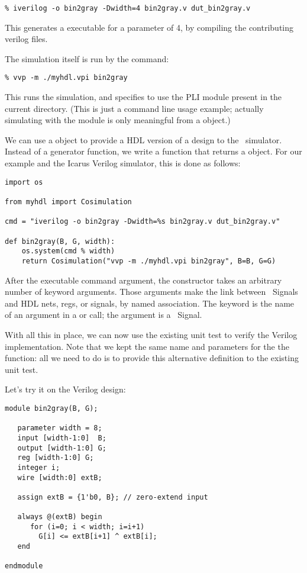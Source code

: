 \begin{verbatim}
% iverilog -o bin2gray -Dwidth=4 bin2gray.v dut_bin2gray.v
\end{verbatim}

This generates a  executable for a parameter 
of 4, by compiling the contributing verilog files.

The simulation itself is run by the  command:

\begin{verbatim}
% vvp -m ./myhdl.vpi bin2gray
\end{verbatim}

This runs the  simulation, and specifies to use the
 PLI module present in the current directory. (This is 
just a command line usage example; actually simulating with the
 module is only meaningful from a
 object.)

We can use a  object to provide a HDL
version of a design to the \myhdl\ simulator. Instead of a generator
function, we write a function that returns a 
object. For our example and the Icarus Verilog simulator, this is done
as follows:

\begin{verbatim}
import os

from myhdl import Cosimulation

cmd = "iverilog -o bin2gray -Dwidth=%s bin2gray.v dut_bin2gray.v"
      
def bin2gray(B, G, width):
    os.system(cmd % width)
    return Cosimulation("vvp -m ./myhdl.vpi bin2gray", B=B, G=G)
\end{verbatim}

After the executable command argument, the 
constructor takes an arbitrary number of keyword arguments. Those
arguments make the link between \myhdl\ Signals and HDL nets, regs, or
signals, by named association. The keyword is the name of an argument
in a  or  call; the argument is
a \myhdl\ Signal.

With all this in place, we can now use the existing unit test
to verify the Verilog implementation. Note that we kept the
same name and parameters for the the  function:
all we need to do is to provide this alternative definition
to the existing unit test.

Let's try it on the Verilog design:

\begin{verbatim}
module bin2gray(B, G);

   parameter width = 8;
   input [width-1:0]  B;
   output [width-1:0] G;
   reg [width-1:0] G;
   integer i;
   wire [width:0] extB;

   assign extB = {1'b0, B}; // zero-extend input

   always @(extB) begin
      for (i=0; i < width; i=i+1)
        G[i] <= extB[i+1] ^ extB[i];
   end

endmodule
\end{verbatim}

